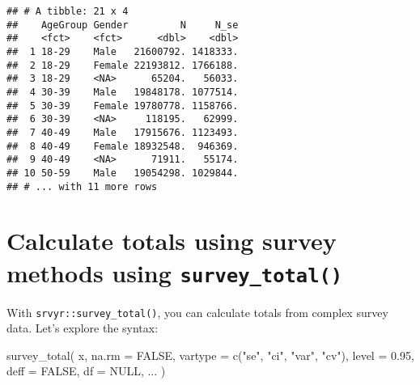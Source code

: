 \documentclass[
]{krantz}
\makeatletter
\newenvironment{Shaded}{\begin{snugshade}}{\end{snugshade}}
\newcommand{\AttributeTok}[1]{\textcolor[rgb]{0.61,0.61,0.61}{#1}}
\newcommand{\ConstantTok}[1]{\textcolor[rgb]{0,0,0}{#1}}
\newcommand{\FloatTok}[1]{\textcolor[rgb]{0.06,0.06,0.06}{#1}}
\newcommand{\FunctionTok}[1]{\textcolor[rgb]{0,0,0}{#1}}
\newcommand{\NormalTok}[1]{#1}
\newcommand{\StringTok}[1]{\textcolor[rgb]{0.5,0.5,0.5}{#1}}
\newenvironment{kframe}{%
\medskip{}
\setlength{\fboxsep}{.8em}
 \def\at@end@of@kframe{}%
 \ifinner\ifhmode%
  \def\at@end@of@kframe{\end{minipage}}%
  \begin{minipage}{\columnwidth}%
 \fi\fi%
 \def\FrameCommand##1{\hskip\@totalleftmargin \hskip-\fboxsep
 \colorbox{shadecolor}{##1}\hskip-\fboxsep
     \hskip-\linewidth \hskip-\@totalleftmargin \hskip\columnwidth}%
 \MakeFramed {\advance\hsize-\width
   \@totalleftmargin\z@ \linewidth\hsize
   \@setminipage}}%
 {\par\unskip\endMakeFramed%
 \at@end@of@kframe}
\renewenvironment{Shaded}{\begin{kframe}}{\end{kframe}}
\makeatother
\begin{document}
\begin{verbatim}
## # A tibble: 21 x 4
##    AgeGroup Gender         N     N_se
##    <fct>    <fct>      <dbl>    <dbl>
##  1 18-29    Male   21600792. 1418333.
##  2 18-29    Female 22193812. 1766188.
##  3 18-29    <NA>      65204.   56033.
##  4 30-39    Male   19848178. 1077514.
##  5 30-39    Female 19780778. 1158766.
##  6 30-39    <NA>     118195.   62999.
##  7 40-49    Male   17915676. 1123493.
##  8 40-49    Female 18932548.  946369.
##  9 40-49    <NA>      71911.   55174.
## 10 50-59    Male   19054298. 1029844.
## # ... with 11 more rows
\end{verbatim}

\hypertarget{calculate-totals-using-survey-methods-using-survey_total}{%
\section{\texorpdfstring{Calculate totals using survey methods using \texttt{survey\_total()}}{Calculate totals using survey methods using survey\_total()}}\label{calculate-totals-using-survey-methods-using-survey_total}}

With \texttt{srvyr::survey\_total()}, you can calculate totals from complex survey data. Let's explore the syntax:

\begin{Shaded}
\begin{Highlighting}[]
\FunctionTok{survey\_total}\NormalTok{(}
\NormalTok{  x,}
  \AttributeTok{na.rm =} \ConstantTok{FALSE}\NormalTok{,}
  \AttributeTok{vartype =} \FunctionTok{c}\NormalTok{(}\StringTok{"se"}\NormalTok{, }\StringTok{"ci"}\NormalTok{, }\StringTok{"var"}\NormalTok{, }\StringTok{"cv"}\NormalTok{),}
  \AttributeTok{level =} \FloatTok{0.95}\NormalTok{,}
  \AttributeTok{deff =} \ConstantTok{FALSE}\NormalTok{,}
  \AttributeTok{df =} \ConstantTok{NULL}\NormalTok{,}
\NormalTok{  ...}
\NormalTok{)}
\end{Highlighting}
\end{Shaded}
\end{document}
